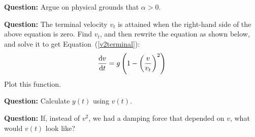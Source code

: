 \begin{question}
\textbf{Question:} Argue on physical grounds that $\alpha >0$.

\textbf{Question:} The terminal velocity $v_t$ is attained when the right-hand side of the above equation is zero. Find $v_t$, and then rewrite the equation as shown below, and solve it to get Equation~(\ref{v2terminal}):
\begin{equation*}
    \dv{v}{t} = g \left(1 - \left(\frac{v}{v_t}\right)^2\right)
\end{equation*}
Plot this function.

\textbf{Question:} Calculate $y(t)$ using $v(t)$.

\textbf{Question:} If, instead of $v^2$, we had a damping force that depended on $v$, what would $v(t)$ look like?

\end{question}







